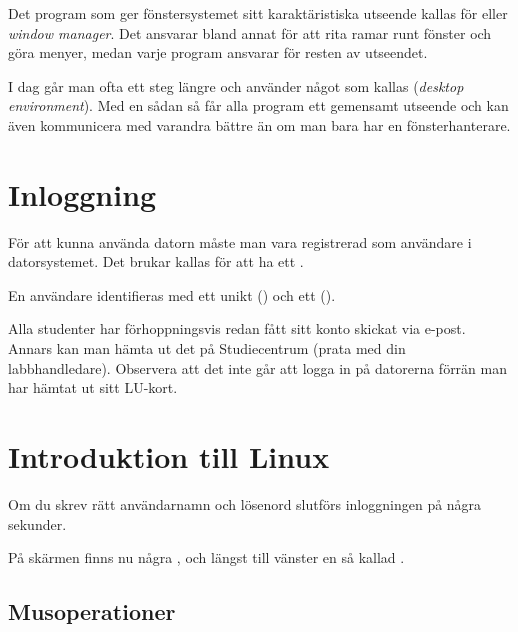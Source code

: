 \documentclass[a4paper,twocolumn]{book}
\begin{document}
Det program som ger fönstersystemet sitt karaktäristiska utseende
kallas för  eller \emph{window manager}. Det
ansvarar bland annat för att rita ramar runt fönster och göra menyer, medan
varje program ansvarar för resten av utseendet.

I dag går man ofta ett steg längre och använder något som kallas
 (\emph{desktop environment}). Med en sådan så får
alla program ett gemensamt utseende och kan även kommunicera med varandra
bättre än om man bara har en fönsterhanterare.




\section{Inloggning}

För att kunna använda datorn måste man vara registrerad som användare
i datorsystemet. Det brukar kallas för att ha ett .

En användare identifieras med ett unikt 
() och ett  ().

Alla studenter har förhoppningsvis redan fått sitt konto skickat via e-post. Annars
kan man hämta ut det på Studiecentrum (prata med din labbhandledare). Observera att det inte går att logga in
på datorerna förrän man har hämtat ut sitt LU-kort.


\section{Introduktion till Linux}

Om du skrev rätt användarnamn och lösenord slutförs inloggningen på några
sekunder.

På skärmen finns nu några , och längst till vänster  en så kallad
.


\subsection{Musoperationer} %
\end{document}
